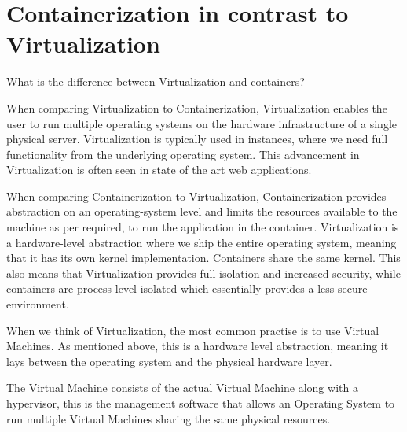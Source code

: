 \documentclass[a4paper,10pt]{article}
\begin{document}
	\section{Containerization in contrast to Virtualization} 
	What is the difference between Virtualization and containers?
	
	When comparing Virtualization to Containerization, Virtualization enables the user to run multiple operating systems on the hardware infrastructure of a single physical server. Virtualization is typically used in instances, where we need full functionality from the underlying operating system. This advancement in Virtualization is often seen in state of the art web applications. 
	
	When comparing Containerization to Virtualization, Containerization provides abstraction on an operating-system level and limits the resources available to the machine as per required, to run the application in the container. Virtualization is a hardware-level abstraction where we ship the entire operating system, meaning that it has its own kernel implementation. Containers share the same kernel. This also means that Virtualization provides full isolation and increased security, while containers are process level isolated which essentially provides a less secure environment. 
	
	When we think of Virtualization, the most common practise is to use Virtual Machines. As mentioned above, this is a hardware level abstraction, meaning it lays between the operating system and the physical hardware layer. 
	
	The Virtual Machine consists of the actual Virtual Machine along with a hypervisor, this is the management software that allows an Operating System to run multiple Virtual Machines sharing the same physical resources. 
	
\end{document}
